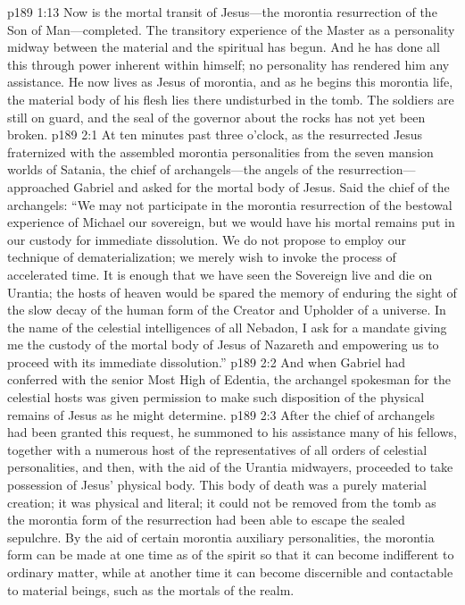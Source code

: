 \vs p189 1:13 Now is the mortal transit of Jesus---the morontia resurrection of the Son of Man---completed. The transitory experience of the Master as a personality midway between the material and the spiritual has begun. And he has done all this through power inherent within himself; no personality has rendered him any assistance. He now lives as Jesus of morontia, and as he begins this morontia life, the material body of his flesh lies there undisturbed in the tomb. The soldiers are still on guard, and the seal of the governor about the rocks has not yet been broken.
\vs p189 2:1 At ten minutes past three o’clock, as the resurrected Jesus fraternized with the assembled morontia personalities from the seven mansion worlds of Satania, the chief of archangels---the angels of the resurrection---approached Gabriel and asked for the mortal body of Jesus. Said the chief of the archangels: “We may not participate in the morontia resurrection of the bestowal experience of Michael our sovereign, but we would have his mortal remains put in our custody for immediate dissolution. We do not propose to employ our technique of dematerialization; we merely wish to invoke the process of accelerated time. It is enough that we have seen the Sovereign live and die on Urantia; the hosts of heaven would be spared the memory of enduring the sight of the slow decay of the human form of the Creator and Upholder of a universe. In the name of the celestial intelligences of all Nebadon, I ask for a mandate giving me the custody of the mortal body of Jesus of Nazareth and empowering us to proceed with its immediate dissolution.”\plusone
\vs p189 2:2 And when Gabriel had conferred with the senior Most High of Edentia, the archangel spokesman for the celestial hosts was given permission to make such disposition of the physical remains of Jesus as he might determine.
\vs p189 2:3 After the chief of archangels had been granted this request, he summoned to his assistance many of his fellows, together with a numerous host of the representatives of all orders of celestial personalities, and then, with the aid of the Urantia midwayers, proceeded to take possession of Jesus’ physical body. This body of death was a purely material creation; it was physical and literal; it could not be removed from the tomb as the morontia form of the resurrection had been able to escape the sealed sepulchre. By the aid of certain morontia auxiliary personalities, the morontia form can be made at one time as of the spirit so that it can become indifferent to ordinary matter, while at another time it can become discernible and contactable to material beings, such as the mortals of the realm.

